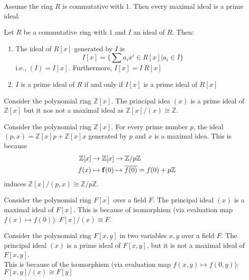 \begin{corollary}
Assume the ring $R$ is commutative with $1$. Then every maximal ideal is a prime ideal.	
\end{corollary}


\begin{proposition}
Let $R$ be a commutative ring with $1$ and $I$ an ideal of $R$. Then:
\begin{enumerate}[label=(\roman*)]
\item The ideal of $R[x]$ generated by $I$ is
\begin{equation}
I[x] = \{\sum a_i x^i \in R[x] | a_i \in I \} \nonumber
\end{equation}
i.e., $(I) = I[x]$. Furthermore, $I[x] = I \ R[x]$
\item $I$ is a prime ideal of $R$ if and only if $I[x]$ is a prime ideal of $R[x]$
\end{enumerate}
\end{proposition}


\begin{example}
Consider the polynomial ring $\mathbb{Z}[x]$.
The principal idea $(x)$ is a prime ideal of $\mathbb{Z}[x]$ but it nos not a maximal ideal as $\mathbb{Z}[x]/(x) \cong \mathbb{Z}$.
\end{example}


\begin{example}
Consider the polynomial ring $\mathbb{Z}[x]$.
For every prime number $p$, the ideal $(p,x)=\mathbb{Z}[x]p + \mathbb{Z}[x]x$ generated by $p$ and $x$ is a maximal idea. This is because 
\begin{align}
\mathbb{Z}[x] &\rightarrow \mathbb{Z}[x] \rightarrow \mathbb{Z}/p\mathbb{Z} \nonumber \\
f(x) &\mapsto \mathbf{f}(0) \mapsto \overline{f(0)} = f(0) + p\mathbb{Z} \nonumber
\end{align}
induces $\mathbb{Z}[x]/(p,x) \cong \mathbb{Z}/p\mathbb{Z}$.
\end{example}


\begin{example}
Consider the polynomial ring $F[x]$ over a field $F$. The principal ideal $(x)$ is a maximal ideal of $F[x]$.
This is because of isomorphism (via evaluation map $f(x) \mapsto f(0)$): $F[x]/(x) \cong F$.
\end{example}


\begin{example}
Consider the polynomial ring $F[x,y]$ in two variables $x,y$ over a field $F$. The principal ideal $(x)$ is a prime ideal of $F[x,y]$, but it is not a maximal ideal of $F[x,y]$.\\
This is because of the isomorphism (via evaluation map $f(x,y) \mapsto f(0,y)$): $F[x,y]/(x) \cong F[y]$
\end{example}


